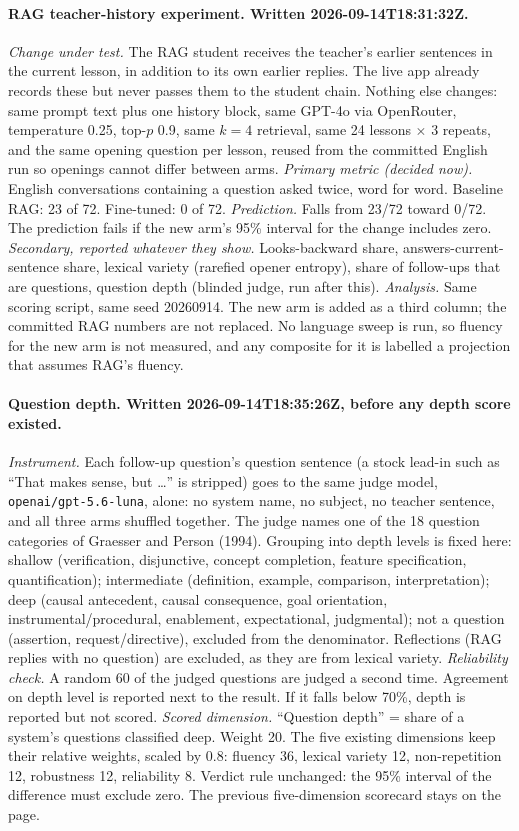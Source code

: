 \documentclass[pdflatex,sn-mathphys-num]{sn-jnl}%
\theoremstyle{thmstyleone}%
\theoremstyle{thmstyletwo}%
\theoremstyle{thmstylethree}%
\begin{document}
\begin{appendices}
\paragraph{RAG teacher-history experiment. Written 2026-09-14T18:31:32Z.}
\emph{Change under test.} The RAG student receives the teacher's earlier sentences in the current
lesson, in addition to its own earlier replies. The live app already records these but never passes
them to the student chain. Nothing else changes: same prompt text plus one history block, same GPT-4o
via OpenRouter, temperature 0.25, top-$p$ 0.9, same $k=4$ retrieval, same 24 lessons $\times$ 3
repeats, and the same opening question per lesson, reused from the committed English run so openings
cannot differ between arms.
\emph{Primary metric (decided now).} English conversations containing a question asked twice, word
for word. Baseline RAG: 23 of 72. Fine-tuned: 0 of 72.
\emph{Prediction.} Falls from 23/72 toward 0/72. The prediction fails if the new arm's 95\% interval
for the change includes zero.
\emph{Secondary, reported whatever they show.} Looks-backward share, answers-current-sentence share,
lexical variety (rarefied opener entropy), share of follow-ups that are questions, question depth
(blinded judge, run after this).
\emph{Analysis.} Same scoring script, same seed 20260914. The new arm is added as a third column; the
committed RAG numbers are not replaced. No language sweep is run, so fluency for the new arm is not
measured, and any composite for it is labelled a projection that assumes RAG's fluency.

\paragraph{Question depth. Written 2026-09-14T18:35:26Z, before any depth score existed.}
\emph{Instrument.} Each follow-up question's question sentence (a stock lead-in such as ``That makes
sense, but \ldots'' is stripped) goes to the same judge model, \texttt{openai/gpt-5.6-luna}, alone:
no system name, no subject, no teacher sentence, and all three arms shuffled together. The judge names
one of the 18 question categories of Graesser and Person (1994). Grouping into depth levels is fixed
here: shallow (verification, disjunctive, concept completion, feature specification, quantification);
intermediate (definition, example, comparison, interpretation); deep (causal antecedent, causal
consequence, goal orientation, instrumental/procedural, enablement, expectational, judgmental); not a
question (assertion, request/directive), excluded from the denominator. Reflections (RAG replies with
no question) are excluded, as they are from lexical variety.
\emph{Reliability check.} A random 60 of the judged questions are judged a second time. Agreement on
depth level is reported next to the result. If it falls below 70\%, depth is reported but not scored.
\emph{Scored dimension.} ``Question depth'' = share of a system's questions classified deep. Weight
20. The five existing dimensions keep their relative weights, scaled by 0.8: fluency 36, lexical
variety 12, non-repetition 12, robustness 12, reliability 8. Verdict rule unchanged: the 95\% interval
of the difference must exclude zero. The previous five-dimension scorecard stays on the page.


\end{appendices}
\end{document}
